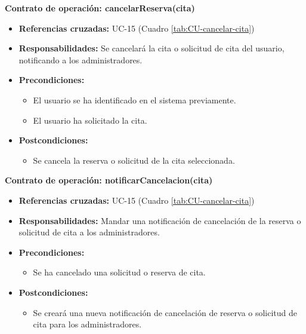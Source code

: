 \textbf{Contrato de operación: cancelarReserva(cita)}
\begin{itemize}
\item \textbf{Referencias cruzadas:} UC-15 (Cuadro \ref{tab:CU-cancelar-cita})
\item \textbf{Responsabilidades:} Se cancelará la cita o solicitud de cita del usuario, notificando a los administradores.
\item \textbf{Precondiciones:} 
 \begin{itemize}
\item El usuario se ha identificado en el sistema previamente.
\item El usuario ha solicitado la cita.
\end {itemize}
\item \textbf{Postcondiciones:} 
 \begin{itemize}
\item Se cancela la reserva o solicitud de la cita seleccionada.
\end {itemize}
\end {itemize}

\textbf{Contrato de operación: notificarCancelacion(cita)}
\begin{itemize}
\item \textbf{Referencias cruzadas:} UC-15 (Cuadro \ref{tab:CU-cancelar-cita})
\item \textbf{Responsabilidades:} Mandar una notificación de cancelación de la reserva o solicitud de cita a los administradores.
\item \textbf{Precondiciones:} 
 \begin{itemize}
\item Se ha cancelado una solicitud o reserva de cita.
\end {itemize}
\item \textbf{Postcondiciones:} 
 \begin{itemize}
\item Se creará una nueva notificación de cancelación de reserva o solicitud de cita para los administradores.
\end {itemize}
\end {itemize}

